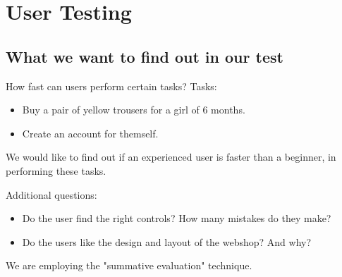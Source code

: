 \section{User Testing}


\subsection{What we want to find out in our test}
How fast can users perform certain tasks?
Tasks:
\begin{itemize}\addtolength{\itemsep}{-0.5\baselineskip}
	\item Buy a pair of yellow trousers for a girl of 6 months.
	\item Create an account for themself.
\end{itemize}
We would like to find out if an experienced user is faster than a beginner, in performing these tasks.

Additional questions:
\begin{itemize}\addtolength{\itemsep}{-0.5\baselineskip}
	\item Do the user find the right controls? How many mistakes do they make?
	\item Do the users like the design and layout of the webshop? And why?
\end{itemize}
We are employing the "summative evaluation" technique.


